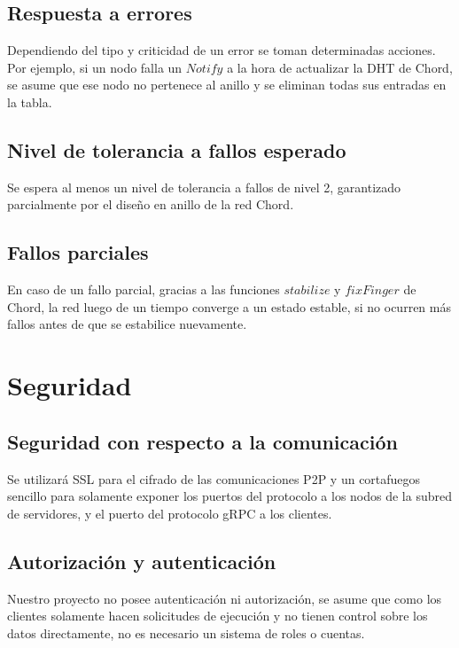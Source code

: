 \documentclass{article}
\begin{document}
\subsection{Respuesta a errores}
Dependiendo del tipo y criticidad de un error se toman determinadas acciones. Por ejemplo, si un nodo falla un $Notify$ a la hora de actualizar la DHT de Chord, se asume que ese nodo no pertenece al anillo y se eliminan todas sus entradas en la tabla.

\subsection{Nivel de tolerancia a fallos esperado}
Se espera al menos un nivel de tolerancia a fallos de nivel 2, garantizado parcialmente por el diseño en anillo de la red Chord.

\subsection{Fallos parciales}
En caso de un fallo parcial, gracias a las funciones $stabilize$ y $fixFinger$ de Chord, la red luego de un tiempo converge a un estado estable, si no ocurren más fallos antes de que se estabilice nuevamente.

\section{Seguridad}
\subsection{Seguridad con respecto a la comunicación}
Se utilizará SSL para el cifrado de las comunicaciones P2P y un cortafuegos sencillo para solamente exponer los puertos del protocolo a los nodos de la subred de servidores, y el puerto del protocolo gRPC a los clientes.

\subsection{Autorización y autenticación}
Nuestro proyecto no posee autenticación ni autorización, se asume que como los clientes solamente hacen solicitudes de ejecución y no tienen control sobre los datos directamente, no es necesario un sistema de roles o cuentas.
\end{document}

